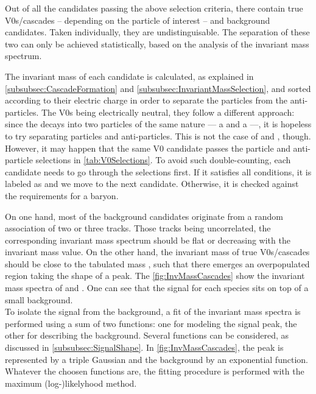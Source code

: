 Out of all the candidates passing the above selection criteria, there contain true V0s/cascades -- depending on the particle of interest -- and background candidates. Taken individually, they are undistinguisable. The separation of these two can only be achieved statistically, based on the analysis of the invariant mass spectrum.

The invariant mass of each candidate is calculated, as explained in \Sec\ref{subsubsec:CascadeFormation} and \Sec\ref{subsubsec:InvariantMassSelection}, and sorted according to their electric charge in order to separate the particles from the anti-particles. The V0s being electrically neutral, they follow a different approach: since the \rmKzeroS decays into two particles of the same nature --- a \rmPiPlus and a \rmPiMinus ---, it is hopeless to try separating particles and anti-particles. This is not the case of \rmLambda and \rmAlambda, though. However, it may happen that the same V0 candidate passes the particle and anti-particle selections in \tab\ref{tab:V0Selections}. To avoid such double-counting, each candidate needs to go through the \rmLambda selections first. If it satisfies all conditions, it is labeled as \rmLambda and we move to the next candidate. Otherwise, it is checked against the requirements for a \rmAlambda baryon.

On one hand, most of the background candidates originate from a random association of two or three tracks. Those tracks being uncorrelated, the corresponding invariant mass spectrum should be flat or decreasing with the invariant mass value. On the other hand, the invariant mass of true V0s/cascades should be close to the tabulated mass \mPDG, such that there emerges an overpopulated region taking the shape of a peak. The \figs\ref{fig:InvMassCascades} show the invariant mass spectra of \rmXi and \rmOmega.  One can see that the signal for each species sits on top of a small background.\\

To isolate the signal from the background, a fit of the invariant mass spectra is performed using a sum of two functions: one for modeling the signal peak, the other for describing the background. Several functions can be considered, as discussed in \Sec\ref{subsubsec:SignalShape}. In \figs\ref{fig:InvMassCascades}, the peak is represented by a triple Gaussian \cite{atlascollaborationKshortLambdaProduction2012} and the background by an exponential function. Whatever the choosen functions are, the fitting procedure is performed with the maximum (log-)likelyhood method.

